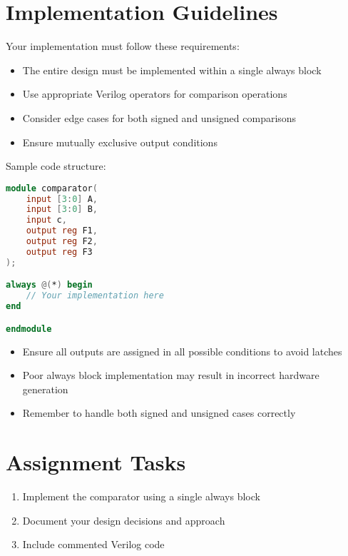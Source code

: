 \documentclass[12pt]{labmanual}
\begin{document}
\section{Implementation Guidelines}

\begin{extra}[frametitle={Design Approach}]
Your implementation must follow these requirements:
\begin{itemize}
    \item The entire design must be implemented within a single always block
    \item Use appropriate Verilog operators for comparison operations
    \item Consider edge cases for both signed and unsigned comparisons
    \item Ensure mutually exclusive output conditions
\end{itemize}
\end{extra}

Sample code structure:
\begin{lstlisting}[language=Verilog]
module comparator(
    input [3:0] A,
    input [3:0] B,
    input c,
    output reg F1,
    output reg F2,
    output reg F3
);

always @(*) begin
    // Your implementation here
end

endmodule
\end{lstlisting}

\begin{important}[frametitle={Common Pitfalls}]
\begin{itemize}
    \item Ensure all outputs are assigned in all possible conditions to avoid latches
    \item Poor always block implementation may result in incorrect hardware generation
    \item Remember to handle both signed and unsigned cases correctly
\end{itemize}
\end{important}

\section{Assignment Tasks}

\begin{question}
\begin{enumerate}
    \item Implement the comparator using a single always block
    \item Document your design decisions and approach
    \item Include commented Verilog code
\end{enumerate}
\end{question}
\end{document}
